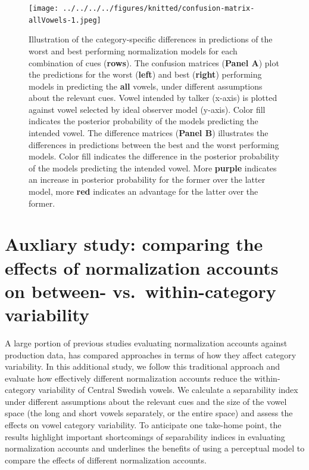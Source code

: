 \documentclass[utf8]{frontiers_suppmat} %
\begin{document}
\begin{landscape}
\begin{figure}[H]

{\centering \texttt{[image: ../../../../figures/knitted/confusion-matrix-allVowels-1.jpeg]} 

}

\caption{Illustration of the category-specific differences in predictions of the worst and best performing normalization models for each combination of cues (\textbf{rows}). The confusion matrices (\textbf{Panel A}) plot the predictions for the worst (\textbf{left}) and best (\textbf{right}) performing models in predicting the \textbf{all} vowels, under different assumptions about the relevant cues. Vowel intended by talker (x-axis) is plotted against vowel selected by ideal observer model (y-axis). Color fill indicates the posterior probability of the models predicting the intended vowel. The difference matrices (\textbf{Panel B}) illustrates the differences in predictions between the best and the worst performing models. Color fill indicates the difference in the posterior probability of the models predicting the intended vowel. More \textbf{purple} indicates an increase in posterior probability for the former over the latter model, more \textbf{red} indicates an advantage for the latter over the former.}\label{fig:confusion-matrix-allVowels}
\end{figure}

\end{landscape}



\hypertarget{sec:auxiliaryStudy}{%
\section{Auxliary study: comparing the effects of normalization accounts on between- vs.~within-category variability}\label{sec:auxiliaryStudy}}

A large portion of previous studies evaluating normalization accounts against production data, has compared approaches in terms of how they affect category variability. In this additional study, we follow this traditional approach and evaluate how effectively different normalization accounts reduce the within-category variability of Central Swedish vowels. We calculate a separability index under different assumptions about the relevant cues and the size of the vowel space (the long and short vowels separately, or the entire space) and assess the effects on vowel category variability. To anticipate one take-home point, the results highlight important shortcomings of separability indices in evaluating normalization accounts and underlines the benefits of using a perceptual model to compare the effects of different normalization accounts.
\end{document}
